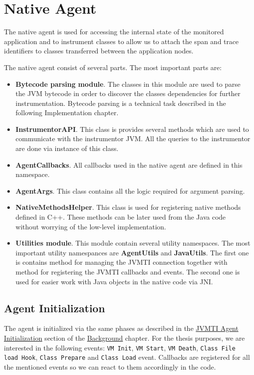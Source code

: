 \section{Native Agent}
The native agent is used for accessing the internal state of the monitored application and to instrument classes to allow us to attach the span and trace identifiers to classes transferred between the application nodes.

The native agent consist of several parts. The most important parts are:
\begin{itemize}
	\item \textbf{Bytecode parsing module}. The classes in this module are used to parse the JVM bytecode in order to discover the classes dependencies for further instrumentation. Bytecode parsing is a technical task described in the following Implementation chapter.
	\item \textbf{InstrumentorAPI}. This class is provides several methods which are used to communicate with the instrumentor JVM. All the queries to the instrumentor are done via instance of this class.
	\item \textbf{AgentCallbacks}. All callbacks used in the native agent are defined in this namespace.
	\item \textbf{AgentArgs}.  This class contains all the logic required for argument parsing.
	\item \textbf{NativeMethodsHelper}. This class is used for registering native methods defined in C++. These methods can be later used from the Java code without worrying of the low-level implementation.
	\item \textbf{Utilities module}. This module contain several utility namespaces. The most important utility namespances are \textbf{AgentUtils} and \textbf{JavaUtils}. The first one is contains method for managing the JVMTI connection together with method for registering the JVMTI callbacks and events. The second one is used for easier work with Java objects in the native code via JNI. 
\end{itemize}

\subsection{Agent Initialization}
The agent is initialized via the same phases as described in the \hyperref[subsec:jvmti_init]{JVMTI Agent Initialization}  section of the \hyperref[chap:background]{Background} chapter. For the thesis purposes, we are interested in the following events: \texttt{VM Init}, \texttt{VM Start}, \texttt{VM Death}, \texttt{Class File load Hook}, \texttt{Class Prepare} and \texttt{Class Load} event. Callbacks are registered for all the mentioned events so we can react to them accordingly in the code.

